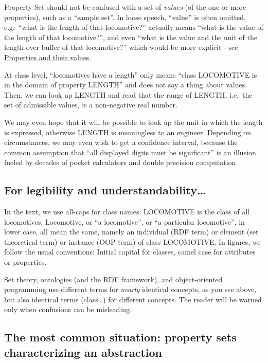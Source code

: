 \documentclass[
  11pt,
]{article}
\begin{document}
Property Set should not be confused with a set of \emph{values} (of the
one or more properties), such as a ``sample set''. In loose speech,
``value'' is often omitted, e.g.~``what is the length of that
locomotive?'' actually means ``what is the value of the length of that
locomotive?'', and even ``what is the value and the unit of the length
over buffer of that locomotive?'' which would be more explicit - see
\protect\hyperlink{and-their-values}{Properties and their values}.

At class level, ``locomotives have a length'' only means ``class
LOCOMOTIVE is in the domain of property LENGTH'' and does not say a
thing about values. Then, we can look up LENGTH and read that the range
of LENGTH, i.e.~the set of admissible values, is a non-negative real
number.

We may even hope that it will be possible to look up the unit in which
the length is expressed, otherwise LENGTH is meaningless to an engineer.
Depending on circumstances, we may even wish to get a confidence
interval, because the common assumption that ``all displayed digits must
be significant'' is an illusion fueled by decades of pocket calculators
and double precision computation.

\hypertarget{for-legibility-and-understandability}{%
\subsection{For legibility and
understandability\ldots{}}\label{for-legibility-and-understandability}}

In the text, we use all-caps for class names: LOCOMOTIVE is the class of
all locomotives. Locomotive, or ``a locomotive'', or ``a particular
locomotive'', in lower case, all mean the same, namely an individual
(RDF term) or element (set theoretical term) or instance (OOP term) of
class LOCOMOTIVE. In figures, we follow the usual conventions: Initial
capital for classes, camel case for attributes or properties.

Set theory, ontologies (and the RDF framework), and object-oriented
programming use different terms for \emph{nearly} identical concepts, as
you see above, but also identical terms (class\ldots) for different
concepts. The reader will be warned only when confusions can be
misleading.

\hypertarget{the-most-common-situation-property-sets-characterizing-an-abstraction}{%
\subsection{The most common situation: property sets characterizing an
abstraction}\label{the-most-common-situation-property-sets-characterizing-an-abstraction}}
\end{document}
